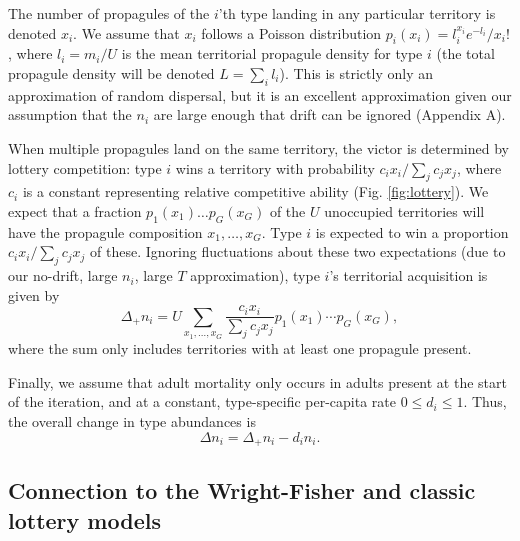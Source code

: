 \documentclass[12pt]{article}
\begin{document}
The number of propagules of the $i$'th type landing in any particular territory is denoted $x_i$. We assume that $x_i$ follows a Poisson distribution $p_i(x_i)=l_i^{x_i} e^{-l_i}/x_i!$, where $l_i=m_i/U$ is the mean territorial propagule density for type $i$ (the total propagule density will be denoted $L=\sum_i l_i$). This is strictly only an approximation of random dispersal, but it is an excellent approximation given our assumption that the $n_i$ are large enough that drift can be ignored (Appendix A).

When multiple propagules land on the same territory, the victor is determined by lottery competition: type $i$ wins a territory with probability $c_i x_i/\sum_j c_j x_j$, where $c_i$ is a constant representing relative competitive ability (Fig. \ref{fig:lottery}). We expect that a fraction $p_1(x_1)\ldots p_G(x_G)$ of the $U$ unoccupied territories will have the propagule composition $x_1,\ldots,x_G$. Type $i$ is expected to win a proportion $c_i x_i/\sum_j c_j x_j$ of these. Ignoring fluctuations about these two expectations (due to our no-drift, large $n_i$, large $T$ approximation), type $i$'s territorial acquisition is given by
\begin{equation}
\Delta_+ n_i=U\sum_{x_1,\ldots,x_G} \frac{c_i x_i}{\sum_j c_j x_j} p_1(x_1)\cdots p_G(x_G), \label{eq:growthsumuncoupled}
\end{equation}
where the sum only includes territories with at least one propagule present.

Finally, we assume that adult mortality only occurs in adults present at the start of the  iteration, and at a constant, type-specific per-capita rate $0\leq d_i\leq 1$. Thus, the overall change in type abundances is
\begin{equation}
\Delta n_i=\Delta_+ n_i-d_i n_i. \label{eq:delttot}
\end{equation}

\subsection*{Connection to the Wright-Fisher and classic lottery models}
\end{document}
